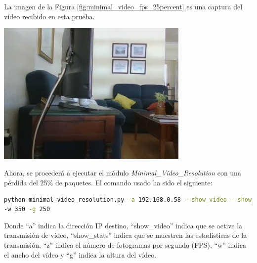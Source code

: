 \newpage
La imagen de la Figura \ref{fig:minimal_video_fps_25percent} es una captura del vídeo recibido en esta prueba.
\begin{center}
  \includegraphics[width = 0.7\textwidth]{images/VideoRecibido8.2.png}
  \label{fig:minimal_video_fps_25percent}
\end{center}

\newpage


Ahora, se procederá a ejecutar el módulo \textit{Minimal\_Video\_Resolution} con una pérdida del 25\% de paquetes. El comando usado ha sido el siguiente:

\begin{lstlisting}[language=bash,basicstyle=\ttfamily\scriptsize]
python minimal_video_resolution.py -a 192.168.0.58 --show_video --show_stats -z 12 \\
-w 350 -g 250
\end{lstlisting}
Donde ``a'' indica la dirección IP destino, ``show\_video'' indica que se active la transmisión de vídeo, ``show\_stats'' indica que se muestren las estadísticas de la transmisión, ``z'' indica el número de fotogramas por segundo (FPS), ``w'' indica el ancho del vídeo y ``g'' indica la altura del vídeo.
\vspace{\baselineskip}

